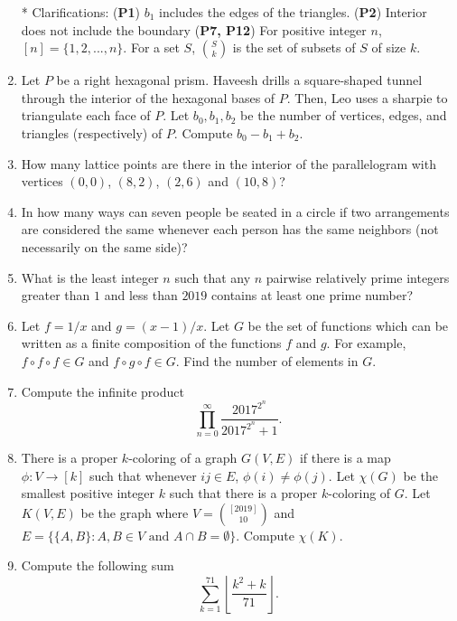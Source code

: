 \documentclass[12pt]{article}
\begin{document}
\begin{multicols}{2}
\begin{enumerate} 
\item[*] Clarifications: (\textbf{P1}) $b_1$ includes the edges of the triangles. (\textbf{P2}) Interior does not include the boundary (\textbf{P7, P12}) For positive integer $n$, $[n] = \{1, 2, ..., n\}$. For a set $S$,  $\binom{S}{k}$ is the set of subsets of $S$ of size $k$. 

\item Let $P$ be a right hexagonal prism. Haveesh drills a square-shaped tunnel through the interior of the hexagonal bases of $P$. Then, Leo uses a sharpie to triangulate each face of $P$. Let $b_0, b_1, b_2$ be the number of vertices, edges, and triangles (respectively) of $P$. Compute $b_0 - b_1 + b_2$.

\item How many lattice points are there in the interior of the parallelogram with vertices $(0, 0)$, $(8, 2)$, $(2, 6)$ and $(10, 8)$?

\item In how many ways can seven people be seated in a circle if two arrangements are considered the same whenever each person has the same neighbors (not necessarily on the same side)? 

\item What is the least integer $n$ such that any $n$ pairwise relatively prime integers greater than $1$ and less than $2019$ contains at least one prime number?

\item Let $f = 1/x$ and $g = (x-1)/x$. Let $G$ be the set of functions which can be written as a finite composition of the functions $f$ and $g$. For example, $f \circ f \circ f \in G$ and $f \circ g \circ f \in G$. Find the number of elements in $G$. 

\item Compute the infinite product
\[
    \prod_{n = 0}^{\infty} \frac{2017^{2^n}}{2017^{2^n} + 1}.
\]

\item There is a proper $k$-coloring of a graph $G(V, E)$ if there is a map $\phi : V \to [k]$ such that whenever $ij \in E$, $\phi(i) \neq \phi(j)$. Let $\chi(G)$ be the smallest positive integer $k$ such that there is a proper $k$-coloring of $G$. Let $K(V, E)$ be the graph where $V = \binom{[2019]}{10}$ and $E = \{\{A, B\} : A, B \in V \text{ and } A \cap B = \emptyset \}.$ Compute $\chi(K)$. 

\item Compute the following sum
\[
    \sum_{k = 1}^{71} \left \lfloor \frac{k^2+k}{71} \right \rfloor.
\]


\end{enumerate}
\end{multicols}
\end{document}
